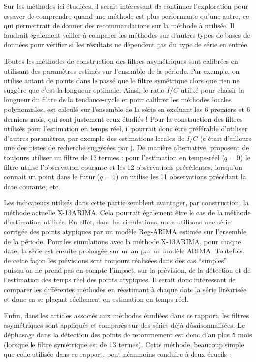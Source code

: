 \documentclass[
  11pt,
  french,
  a4paper]{article}
\newcommand\1{\mathds{1}}
\begin{document}
Sur les méthodes ici étudiées, il serait intéressant de continuer l'exploration pour essayer de comprendre quand une méthode est plus performante qu'une autre, ce qui permettrait de donner des recommandations sur la méthode à utilisée.
Il faudrait également veiller à comparer les méthodes sur d'autres types de bases de données pour vérifier si les résultats ne dépendent pas du type de série en entrée.

Toutes les méthodes de construction des filtres asymétriques sont calibrées en utilisant des paramètres estimés sur l'ensemble de la période.
Par exemple, on utilise autant de points dans le passé que le filtre symétrique alors que rien ne suggère que c'est la longueur optimale.
Ainsi, le ratio \(I/C\) utilisé pour choisir la longueur du filtre de la tendance-cycle et pour calibrer les méthodes locales polynomiales, est calculé sur l'ensemble de la série en excluant les 6 premiers et 6 derniers mois, qui sont justement ceux étudiés !
Pour la construction des filtres utilisés pour l'estimation en temps réel, il pourrait donc être préférable d'utiliser d'autres paramètres, par exemple des estimations locales de \(I/C\) (c'était d'ailleurs une des pistes de recherche suggérées par \textcite{GrayThomson1996}).
De manière alternative, \textcite{vasyechko2014new} proposent de toujours utiliser un filtre de 13 termes : pour l'estimation en temps-réel (\(q=0\)) le filtre utilise l'observation courante et les 12 observations précédentes, lorsqu'on connait un point dans le futur (\(q=1\)) on utilise les 11 observations précédant la date courante, etc.

Les indicateurs utilisés dans cette partie semblent avantager, par construction, la méthode actuelle X-13ARIMA.
Cela pourrait également être le cas de la méthode d'estimation utilisée.
En effet, dans les simulations, nous utilisons une série corrigée des points atypiques par un modèle Reg-ARIMA estimée sur l'ensemble de la période.
Pour les simulations avec la méthode X-13ARIMA, pour chaque date, la série est ensuite prolongée sur un an par un modèle ARIMA.
Toutefois, de cette façon les prévisions sont toujours réalisées dans des cas ``simples'' puisqu'on ne prend pas en compte l'impact, sur la prévision, de la détection et de l'estimation des temps réel des points atypiques.
Il serait donc intéressant de comparer les différentes méthodes en réestimant à chaque date la série linéarisée et donc en se plaçant réellement en estimation en temps-réel.

Enfin, dans les articles associés aux méthodes étudiées dans ce rapport, les filtres asymétriques sont appliqués et comparés sur des séries déjà désaisonnalisées.
Le déphasage dans la détection des points de retournement est donc d'au plus 5 mois (lorsque le filtre symétrique est de 13 termes).
Cette méthode, beaucoup simple que celle utilisée dans ce rapport, peut néanmoins conduire à deux écueils :
\end{document}
